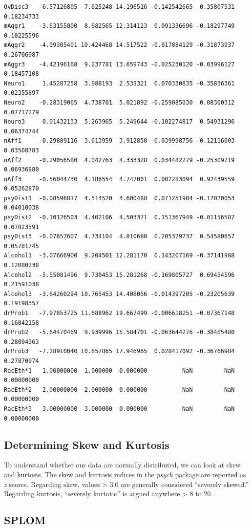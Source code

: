 \documentclass[
  english,
]{book}
\begin{document}
\begin{verbatim}
OvDisc3   -6.57126805  7.625248 14.196516 -0.142542665  0.35807531 0.18234733
mAggr1    -3.63155800  8.682565 12.314123  0.091336696 -0.18297749 0.10225596
mAggr2    -4.09305401 10.424468 14.517522 -0.017884129 -0.31873937 0.26706987
mAggr3    -4.42196168  9.237781 13.659743 -0.025230120 -0.03996127 0.18457108
Neuro1     1.45287258  3.988193  2.535321  0.070330835 -0.35836361 0.02355897
Neuro2    -0.28319065  4.738701  5.021892 -0.259085030  0.08300312 0.07717279
Neuro3     0.01432133  5.263965  5.249644 -0.102274817  0.54931296 0.06374744
nAff1     -0.29889116  3.613959  3.912850 -0.039998756 -0.12116003 0.03508783
nAff2     -0.29056580  4.042763  4.333328  0.034482279 -0.25309219 0.06936880
nAff3     -0.56044730  4.186554  4.747001  0.002283094  0.92439559 0.05262870
psyDist1  -0.08596817  4.514520  4.600488  0.071251904 -0.12020053 0.04010038
psyDist2  -0.10126503  4.402106  4.503371  0.151367949 -0.01156587 0.07023591
psyDist3  -0.07657607  4.734104  4.810680  0.205329737  0.54580657 0.05781745
Alcohol1  -3.07666900  9.204501 12.281170  0.143207169 -0.37141988 0.12080238
Alcohol2  -5.55081496  9.730453 15.281268 -0.169805727  0.69454596 0.21591038
Alcohol3  -3.64260294 10.765453 14.408056 -0.014397205 -0.23205639 0.19198357
drProb1   -7.97853725 11.688962 19.667499 -0.006618251 -0.07367148 0.16842158
drProb2   -5.64470469  9.939996 15.584701 -0.063644276 -0.38485480 0.28094363
drProb3   -7.28910040 10.657865 17.946965  0.028417092 -0.36766984 0.27870974
RacEth*1   1.00000000  1.000000  0.000000          NaN         NaN 0.00000000
RacEth*2   2.00000000  2.000000  0.000000          NaN         NaN 0.00000000
RacEth*3   3.00000000  3.000000  0.000000          NaN         NaN 0.00000000
\end{verbatim}

\hypertarget{determining-skew-and-kurtosis}{%
\subsection{Determining Skew and Kurtosis}\label{determining-skew-and-kurtosis}}

To understand whether our data are normally distributed, we can look at skew and kurtosis. The skew and kurtosis indices in the \emph{psych} package are reported as \emph{z} scores. Regarding skew, values \textgreater{} 3.0 are generally considered ``severely skewed.'' Regarding kurtosis, ``severely kurtotic'' is argued anywhere \textgreater{} 8 to 20 \citep{kline_principles_2016}.

\hypertarget{splom}{%
\subsection{SPLOM}\label{splom}}
\end{document}
